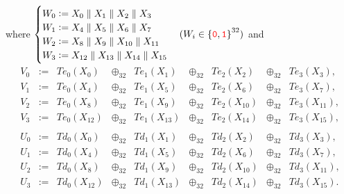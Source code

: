 where $\begin{cases}
	W_0:=X_0\parallel X_1\parallel X_2\parallel X_3\\
	W_1:=X_4\parallel X_5\parallel X_6\parallel X_7\\
	W_2:=X_8\parallel X_9\parallel X_{10}\parallel X_{11}\\
	W_3:=X_{12}\parallel X_{13}\parallel X_{14}\parallel X_{15}
\end{cases} (W_i\in\set{\textcolor{red}{\texttt{0}},\textcolor{red}{\texttt{1}}}^{32})$ and \[
\begin{array}{ccccccccc}
V_0 & := & Te_0(X_0) & \oplus_{32} & Te_1(X_1) &\oplus_{32} & Te_2(X_2) &\oplus_{32} & Te_3(X_3), \\
V_1 & := & Te_0(X_4) & \oplus_{32} & Te_1(X_5) &\oplus_{32} & Te_2(X_6) &\oplus_{32} & Te_3(X_7), \\
V_2 & := & Te_0(X_8) & \oplus_{32} & Te_1(X_9) &\oplus_{32} & Te_2(X_{10}) &\oplus_{32} & Te_3(X_{11}), \\
V_3 & := & Te_0(X_{12}) & \oplus_{32} & Te_1(X_{13}) &\oplus_{32} & Te_2(X_{14}) &\oplus_{32} & Te_3(X_{15}), \\
\\
U_0 & := & Td_0(X_0) & \oplus_{32} & Td_1(X_1) &\oplus_{32} & Td_2(X_2) &\oplus_{32} & Td_3(X_3), \\
U_1 & := & Td_0(X_4) & \oplus_{32} & Td_1(X_5) &\oplus_{32} & Td_2(X_6) &\oplus_{32} & Td_3(X_7), \\
U_2 & := & Td_0(X_8) & \oplus_{32} & Td_1(X_9) &\oplus_{32} & Td_2(X_{10}) &\oplus_{32} & Td_3(X_{11}), \\
U_3 & := & Td_0(X_{12}) & \oplus_{32} & Td_1(X_{13}) &\oplus_{32} & Td_2(X_{14}) &\oplus_{32} & Td_3(X_{15}). \\
\end{array}
\]





